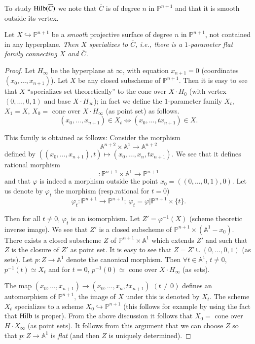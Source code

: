 {To study $\operatorname{Hilb}(\overline{C})$ we note that $\overline{C}$ is of
degree $n$ in $\mathbb{P}^{n+1}$ and that it is smooth outside its
vertex.

\begin{proposition}\label{part1-prop13.2}
Let $X\hookrightarrow \mathbb{P}^{n+1}$ be a {\em smooth} projective
surface of degree $n$ in $\mathbb{P}^{n+1}$, not contained in any
hyperplane. {\em Then $X$ specializes to $\overline{C}$, i.e., there
  is a $1$-parameter flat family connecting $X$ and $\overline{C}$.}
\end{proposition}

\begin{proof}
Let $H_{\infty}$ be the hyperplane at $\infty$, with equation
$x_{n+1}=0$ (coordinates $(x_{0},\ldots,x_{n+1})$). Let $X$ be any
closed subscheme of $\mathbb{P}^{n+1}$. Then it is easy to see that
$X$ ``specializes set theoretically'' to the cone over $X\cdot H_{0}$
(with vertex $(0,\ldots,0,1)$ and base $X\cdot H_{\infty}$); in fact
we define the $1$-parameter family $X_{t}$, $X_{1}=X$, $X_{0}=$ cone
over $X\cdot H_{\infty}$ (as point set) as follows.
$$
(x_{0},\ldots,x_{n+1})\in X_{t}\Longleftrightarrow
(x_{0},\ldots,tx_{n+1})\in X. 
$$

This family is obtained as follows: Consider the morphism
$$
\mathbb{A}^{n+2}\times\mathbb{A}^{1}\to \mathbb{A}^{n+2}
$$
defined by $((x_{0},\ldots,x_{n+1}),t)\mapsto
(x_{0},\ldots,x_{n},tx_{n+1})$. We see that it defines rational
morphism
$$
:\mathbb{P}^{n+1}\times\mathbb{A}^{1}\to \mathbb{P}^{n+1}
$$\pageoriginale
and that $\varphi$ is indeed a morphism outside the point
$x_{0}=((0,\ldots,0,1),0)$. Let us denote by $\varphi_{t}$ the
morphism (resp.\@ rational for $t=0$)
$$
\varphi_{t}:\mathbb{P}^{n+1}\to
\mathbb{P}^{n+1};\ \varphi_{t}=\varphi|\mathbb{P}^{n+1}\times\{t\}.
$$

Then for all $t\neq 0$, $\varphi_{t}$ is an isomorphism. Let
$Z'=\varphi^{-1}(X)$ (scheme theoretic inverse image). We see that
$Z'$ is a closed subscheme of $\mathbb{P}^{n+1}\times
(\mathbb{A}^{1}-x_{0})$. There exists a closed subscheme $Z$ of
$\mathbb{P}^{n+1}\times \mathbb{A}^{1}$ which extends $Z'$ and such
that $Z$ is the closure of $Z'$ as point set. It is easy to see that
$Z=Z'\cup (0,\ldots,0,1)$ (as sets). Let $p:Z\to \mathbb{A}^{1}$
denote the canonical morphism. Then $\forall t\in \mathbb{A}^{1}$,
$t\neq 0$, $p^{-1}(t)\simeq X_{t}$ and for $t=0$, $p^{-1}(0)\simeq $
cone over $X\cdot H_{\infty}$ (as sets).

The map $(x_{0},\ldots,x_{n+1})\to (x_{0},\ldots,x_{n},tx_{n+1})$
$(t\neq 0)$ defines an automorphism of $\mathbb{P}^{n+1}$, the image
of $X$ under this is denoted by $X_{t}$. The scheme $X_{t}$
specializes to a scheme $X_{0}\hookrightarrow \mathbb{P}^{n+1}$ (this
follows for example by using the fact that $\operatorname{Hilb}$ is proper). From
the above discussion it follows that $X_{0}=$ cone over $H\cdot
X_{\infty}$ (as point sets). It follows from this  argument that we
can choose $Z$ so that $p:Z\to \mathbb{A}^{1}$ is {\em flat} (and then
$Z$ is uniquely determined).


\end{proof}}
